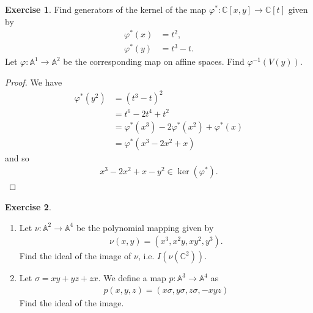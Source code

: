 \documentclass[12pt]{extarticle}
\newcommand{\C}{\mathbb{C}}
\newcommand{\<}{\langle}
\renewcommand{\>}{\rangle}
\theoremstyle{definition}
\newtheorem{exercise}{Exercise}
\begin{document}
\begin{exercise}
  Find generators of the kernel of the map $\varphi^*: \C[x,y] \to \C[t]$ given by
  \begin{align*}
    \varphi^*(x) &= t^2, \\
    \varphi^*(y) &= t^3-t.
  \end{align*}
  Let $\varphi: \mathbb{A}^1 \to \mathbb{A}^2$ be the corresponding map on affine spaces. Find $\varphi^{-1}(V(y))$.
\end{exercise}
\begin{proof}
  We have
  \begin{align*}
    \varphi^*(y^2) 
    &= (t^3-t)^2 \\
    &= t^6 - 2t^4 + t^2 \\
    &= \varphi^*(x^3) -  2\varphi^*(x^2) + \varphi^*(x) \\
    &= \varphi^*(x^3 - 2x^2 + x)
  \end{align*}
  and so
  \begin{align*}
    x^3 - 2x^2 + x - y^2  \in \ker(\varphi^*).
  \end{align*}

\end{proof}
\begin{exercise}
  \begin{enumerate}
  \item
    Let $\nu: \mathbb{A}^2 \to \mathbb{A}^4$ be the polynomial mapping given by
    \begin{align*}
      \nu(x,y) = (x^3, x^2y, xy^2, y^3).
    \end{align*}
    Find the ideal of the image of $\nu$, i.e. $I(\nu(\mathbb{C}^2))$.
  \item
    Let $\sigma = xy + yz + zx.$ We define a map $p: \mathbb{A}^3 \to \mathbb{A}^4$ as
    \begin{align*}
      p(x,y,z)=(x\sigma, y\sigma, z\sigma, -xyz)
    \end{align*}
    Find the ideal of the image.
  \end{enumerate}
\end{exercise}
\end{document}
